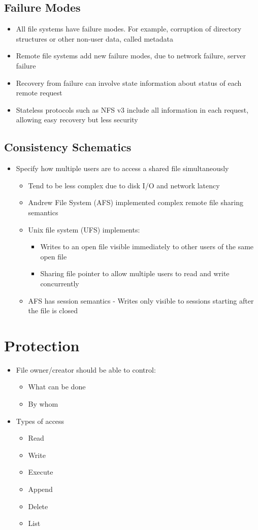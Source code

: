 \documentclass{article}[18pt]
\begin{document}
\subsection{Failure Modes}
\begin{itemize}
	\item All file systems have failure modes. For example, corruption of directory structures or other non-user data, called metadata
	\item Remote file systems add new failure modes, due to network failure, server failure
	\item Recovery from failure can involve state information about status of each remote request
	\item Stateless protocols such as NFS v3 include all information in each request, allowing easy recovery but less security
\end{itemize}
\subsection{Consistency Schematics}
\begin{itemize}
	\item Specify how multiple users are to access a shared file simultaneously
	\begin{itemize}
		\item Tend to be less complex due to disk I/O and network latency
		\item Andrew File System (AFS) implemented complex remote file sharing semantics
		\item Unix file system (UFS) implements:
		\begin{itemize}
			\item Writes to an open file visible immediately to other users of the same open file
			\item Sharing file pointer to allow multiple users to read and write concurrently
		\end{itemize}
		\item AFS has session semantics - Writes only visible to sessions starting after the file is closed
	\end{itemize}
\end{itemize}
\section{Protection}
\begin{itemize}
	\item File owner/creator should be able to control:
	\begin{itemize}
		\item What can be done
		\item By whom
	\end{itemize}
	\item Types of access
	\begin{itemize}
		\item Read
		\item Write
		\item Execute
		\item Append
		\item Delete
		\item List
	\end{itemize}
\end{itemize}
\end{document}
